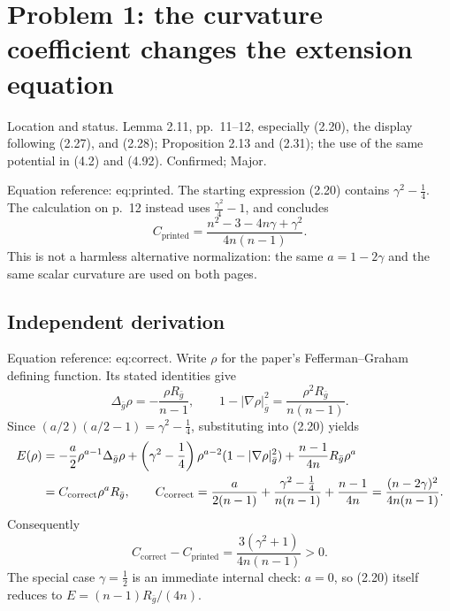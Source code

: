 \documentclass[10pt]{article}
\begin{document}
\section*{Problem 1: the curvature coefficient changes the extension equation}
Location and status. Lemma 2.11, pp. 11–12, especially (2.20), the display following (2.27), and (2.28); Proposition 2.13 and (2.31); the use of the same potential in (4.2) and (4.92). Confirmed; Major.\par
Equation reference: eq:printed. The starting expression (2.20) contains \(\gamma^2-\tfrac14\). The calculation on p. 12 instead uses \(\tfrac{\gamma^2}{4}-1\), and concludes \[
 C_{\mathrm{printed}}=\frac{n^2-3-4n\gamma+\gamma^2}{4n(n-1)}.\] This is not a harmless alternative normalization: the same \(a=1-2\gamma\) and the same scalar curvature are used on both pages.\par
\subsection*{Independent derivation}
Equation reference: eq:correct. Write \(\rho\) for the paper’s Fefferman–Graham defining function. Its stated identities give \[\Delta_{\bar g}\rho=-\frac{\rho R_{\bar g}}{n-1},
 \qquad
 1-|\nabla\rho|_{\bar g}^{2}=\frac{\rho^{2}R_{\bar g}}{n(n-1)}.\] Since \((a/2)(a/2-1)=\gamma^2-\tfrac14\), substituting into (2.20) yields \[\begin{aligned}
 E(\rho)
 &= -\frac a2\rho^{a-1}\Delta_{\bar g}\rho
   +\left(\gamma^2-\frac14\right)\rho^{a-2}
       (1-|\nabla\rho|_{\bar g}^{2})
   +\frac{n-1}{4n}R_{\bar g}\rho^a \notag\\
 &= C_{\mathrm{correct}}\rho^aR_{\bar g},\qquad
 C_{\mathrm{correct}}
 =\frac{a}{2(n-1)}
  +\frac{\gamma^2-\tfrac14}{n(n-1)}
  +\frac{n-1}{4n}
 =\frac{(n-2\gamma)^2}{4n(n-1)}.                 \end{aligned}\] Consequently \[C_{\mathrm{correct}}-C_{\mathrm{printed}}
   =\frac{3(\gamma^2+1)}{4n(n-1)}>0.\] The special case \(\gamma=\tfrac12\) is an immediate internal check: \(a=0\), so (2.20) itself reduces to \(E=(n-1)R_{\bar g}/(4n)\).\par
\end{document}
